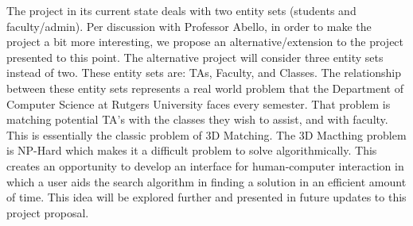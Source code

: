 The project in its current state deals with two entity sets (students and faculty/admin). Per discussion with Professor Abello, in order to make the project a bit more interesting, we propose an alternative/extension to the project presented to this point. The alternative project will consider three entity sets instead of two. These entity sets are: TAs, Faculty, and Classes. The relationship between these entity sets represents a real world problem that the Department of Computer Science at Rutgers University faces every semester. That problem is matching potential TA's with the classes they wish to assist, and with faculty. This is essentially the classic problem of 3D Matching. The 3D Macthing problem is NP-Hard which makes it a difficult problem to solve algorithmically. This creates an opportunity to develop an interface for human-computer interaction in which a user aids the search algorithm in finding a solution in an efficient amount of time. This idea will be explored further and presented in future updates to this project proposal.